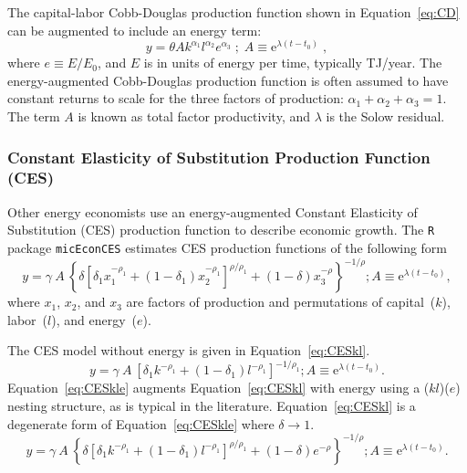 \documentclass[preprint,authoryear,12pt]{elsarticle}\usepackage[]{graphicx}\usepackage[]{color}
\begin{document}
The capital-labor Cobb-Douglas production function shown in Equation~\ref{eq:CD}
can be augmented to include an energy term:
%
\begin{equation} \label{eq:CDe}
  y = \theta A k^{\alpha_1} l^{\alpha_2} e^{\alpha_3} \; ; \; A \equiv \mathrm{e}^{\lambda(t-t_0)} \; ,
\end{equation}
%
where $e \equiv E/E_0$, and $E$ is in units of energy per time, typically TJ/year.
The energy-augmented Cobb-Douglas production function 
is often assumed to have constant returns to scale for the three factors 
of production: $\alpha_1 + \alpha_2 + \alpha_3 = 1$.
The term $A$ is known as total factor productivity,
and $\lambda$ is the Solow residual. 


\subsubsection{Constant Elasticity of Substitution Production Function (CES)} 
\label{sec:CES}

Other energy economists use an energy-augmented 
Constant Elasticity of Substitution (CES) production function to 
describe economic growth. The \texttt{R} 
package \texttt{micEconCES} 
estimates CES production 
functions of the following form
%
\begin{equation} \label{eq:CESgeneric}
  y = \gamma \: A \: \left\{\delta \left[\delta_1 x_1^{-\rho_1} 
      + (1-\delta_1)x_2^{-\rho_1} \right]^{\rho/\rho_1} 
      + (1-\delta) x_3^{-\rho} \right\}^{-1/\rho}; 
      A \equiv \mathrm{e}^{\lambda (t-t_0)},
\end{equation}
%
where $x_1$, $x_2$, and $x_3$ are factors of production
and permutations of capital~($k$), labor~($l$), and energy~($e$).

The CES model without energy is given in Equation~\ref{eq:CESkl}.
%
\begin{equation} \label{eq:CESkl}
  y = \gamma \: A \: \left[\delta_1 k^{-\rho_1} 
      + (1-\delta_1)l^{-\rho_1} \right]^{-1/\rho_1}; 
      A \equiv \mathrm{e}^{\lambda (t-t_0)} . 
\end{equation}
%
Equation~\ref{eq:CESkle} augments Equation~\ref{eq:CESkl} with energy 
using a ($kl$)($e$) nesting structure, as is typical in the literature. 
Equation~\ref{eq:CESkl} is a degenerate form of Equation~\ref{eq:CESkle} 
where $\delta \rightarrow 1$. 
%
\begin{equation} \label{eq:CESkle}
  y = \gamma \: A \: \left\{\delta \left[\delta_1 k^{-\rho_1} 
      + (1-\delta_1)l^{-\rho_1} \right]^{\rho/\rho_1} 
      + (1-\delta) e^{-\rho} \right\}^{-1/\rho}; 
      A \equiv \mathrm{e}^{\lambda (t-t_0)}.
\end{equation}
%
\end{document}
